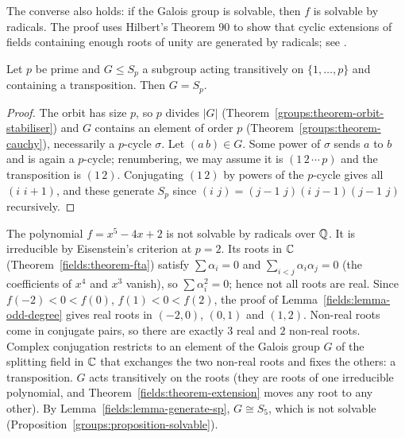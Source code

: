 \begin{remark}\label{fields:remark-converse-radicals}
The converse also holds: if the Galois group is solvable, then $f$ is solvable by radicals.
The proof uses Hilbert's Theorem 90 to show that cyclic extensions of fields containing
enough roots of unity are generated by radicals; see \cite[Chapter VI, \S 7]{lang-algebra}.
\end{remark}

\begin{lemma}\label{fields:lemma-generate-sp}
Let $p$ be prime and $G \leq S_p$ a subgroup acting transitively on $\{1, \ldots, p\}$ and containing a
transposition. Then $G = S_p$.
\end{lemma}

\begin{proof}
The orbit has size $p$, so $p$ divides $|G|$ (Theorem~\ref{groups:theorem-orbit-stabiliser}) and $G$
contains an element of order $p$ (Theorem~\ref{groups:theorem-cauchy}), necessarily a $p$-cycle
$\sigma$. Let $(a\,b) \in G$. Some power of $\sigma$ sends $a$ to $b$ and is again a $p$-cycle; renumbering,
we may assume it is $(1\,2\,\cdots\,p)$ and the transposition is $(1\,2)$. Conjugating $(1\,2)$ by powers
of the $p$-cycle gives all $(i\,\,i{+}1)$, and these generate $S_p$ since
$(i\,\,j) = (j{-}1\,\,j)(i\,\,j{-}1)(j{-}1\,\,j)$ recursively.
\end{proof}

\begin{example}\label{fields:example-quintic}
The polynomial $f = x^5 - 4x + 2$ is not solvable by radicals over $\mathbb{Q}$. It is irreducible by
Eisenstein's criterion at $p = 2$. Its roots in $\mathbb{C}$ (Theorem~\ref{fields:theorem-fta}) satisfy
$\sum \alpha_i = 0$ and $\sum_{i<j}\alpha_i\alpha_j = 0$ (the coefficients of $x^4$ and $x^3$ vanish), so
$\sum \alpha_i^2 = 0$; hence not all roots are real. Since $f(-2) < 0 < f(0)$, $f(1) < 0 < f(2)$, the proof
of Lemma~\ref{fields:lemma-odd-degree} gives real roots in $(-2, 0)$, $(0, 1)$ and $(1, 2)$. Non-real
roots come in conjugate pairs, so there are exactly $3$ real and $2$ non-real roots. Complex
conjugation restricts to an element of the Galois group $G$ of the splitting field in $\mathbb{C}$ that
exchanges the two non-real roots and fixes the others: a transposition. $G$ acts transitively
on the roots (they are roots of one irreducible polynomial, and
Theorem~\ref{fields:theorem-extension} moves any root to any other). By
Lemma~\ref{fields:lemma-generate-sp}, $G \cong S_5$, which is not solvable
(Proposition~\ref{groups:proposition-solvable}).
\end{example}

